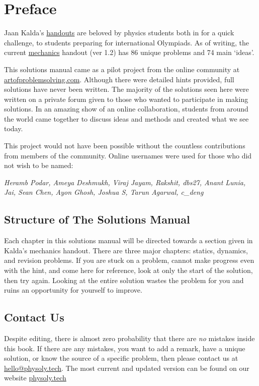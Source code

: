 \documentclass[11pt]{article}
\begin{document}
\section*{Preface}
\vspace{-5mm}
\indent Jaan Kalda's \href{https://www.ioc.ee/~kalda/ipho/}{handouts} are beloved by physics students both in for a quick challenge, to students preparing for international Olympiads. As of writing, the current \href{https://www.ioc.ee/~kalda/ipho/meh_ENG2.pdf}{mechanics} handout (ver 1.2) has 86 unique problems and 74 main `ideas'.

This solutions manual came as a pilot project from the online community at \url{artofproblemsolving.com}. Although there were detailed hints provided, full solutions have never been written. The majority of the solutions seen here were written on a private forum given to those who wanted to participate in making solutions. In an amazing show of an online collaboration, students from around the world came together to discuss ideas and methods and created what we see today.

This project would not have been possible without the countless contributions from members of the community. Online usernames were used for those who did not wish to be named: 

\textit{Heramb Podar, Ameya Deshmukh, Viraj Jayam, Rakshit, dbs27, Anant Lunia, Jai, Sean Chen, Ayon Ghosh, Joshua S, Tarun Agarwal, c\_deng}
\subsection*{Structure of The Solutions Manual}
\vspace{-5mm}
Each chapter in this solutions manual will be directed towards a section given in Kalda's mechanics handout. There are three major chapters: statics, dynamics, and revision problems. If you are stuck on a problem, cannot make progress even with the hint, and come here for reference, look at only the start of the solution, then try again. Looking at the entire solution wastes the problem for you and ruins an opportunity for yourself to improve.

\subsection*{Contact Us}
\vspace{-5mm}
Despite editing, there is almost zero probability that there are \textit{no} mistakes inside this book. If there are any mistakes, you want to add a remark, have a unique solution, or know the source of a specific problem, then please contact us at \url{hello@physoly.tech}. The most current and updated version can be found on our website \url{physoly.tech}
\end{document}
